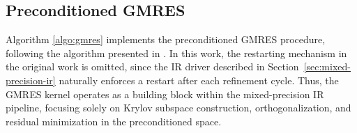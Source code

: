 \subsection{Preconditioned GMRES}
\label{sec:preconditioned-gmres}

Algorithm \ref{algo:gmres} implements the preconditioned GMRES procedure, following
the algorithm presented in \cite{lindquist_improving_2020}. In this work, the
restarting mechanism in the original work is omitted, since the IR driver
described in Section~\ref{sec:mixed-precision-ir} naturally enforces a restart
after each refinement cycle. Thus, the GMRES kernel operates as a building block
within the mixed-precision IR pipeline, focusing solely on Krylov subspace
construction, orthogonalization, and residual minimization in the preconditioned
space.

